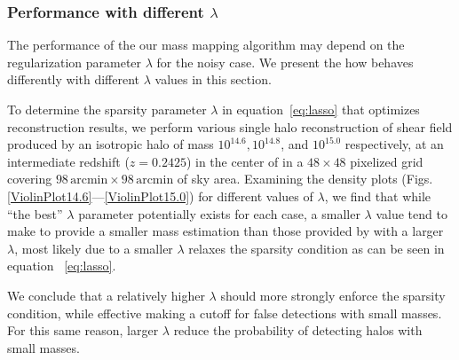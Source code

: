 \documentclass[twocolumn, usenames, dvipsnames]{aastex63}
\begin{document}
\subsubsection{Performance with different $\lambda$}
\label{sec:oneHalo_noisy_lambda}

The performance of the our mass mapping algorithm may depend on the
regularization parameter $\lambda$ for the noisy case. We present the how
\splinv{} behaves differently with different $\lambda$ values in this section.

To determine the sparsity parameter $\lambda$ in equation~\eqref{eq:lasso} that
optimizes reconstruction results, we perform various single halo reconstruction
of shear field produced by an isotropic halo of mass $10^{14.6}, 10^{14.8}$,
and $10^{15.0}$ respectively, at an intermediate redshift ($z=0.2425$) in the
center of in a $48 \times 48$ pixelized grid covering $98 \,\text{arcmin}
\times 98\, \text{arcmin}$ of sky area. Examining the density plots (Figs.
\ref{ViolinPlot14.6}---\ref{ViolinPlot15.0}) for different values of $\lambda$,
we find that while ``the best'' $\lambda$ parameter potentially exists for each
case, a smaller $\lambda$ value tend to make \splinv{} to provide a smaller
mass estimation than those provided by \splinv{} with a larger $\lambda$, most
likely due to a smaller $\lambda$ relaxes the sparsity condition as can be seen
in equation ~\eqref{eq:lasso}.

We conclude that a relatively higher $\lambda$ should more strongly enforce the
sparsity condition, while effective making a cutoff for false detections with
small masses. For this same reason, larger $\lambda$ reduce the probability of
detecting halos with small masses.
\end{document}

